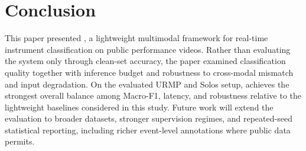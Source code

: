 \section{Conclusion}
\label{sec:conclusion}

This paper presented \method{}, a lightweight multimodal framework for real-time instrument classification on public performance videos. Rather than evaluating the system only through clean-set accuracy, the paper examined classification quality together with inference budget and robustness to cross-modal mismatch and input degradation. On the evaluated URMP and Solos setup, \method{} achieves the strongest overall balance among Macro-F1, latency, and robustness relative to the lightweight baselines considered in this study. Future work will extend the evaluation to broader datasets, stronger supervision regimes, and repeated-seed statistical reporting, including richer event-level annotations where public data permits.
